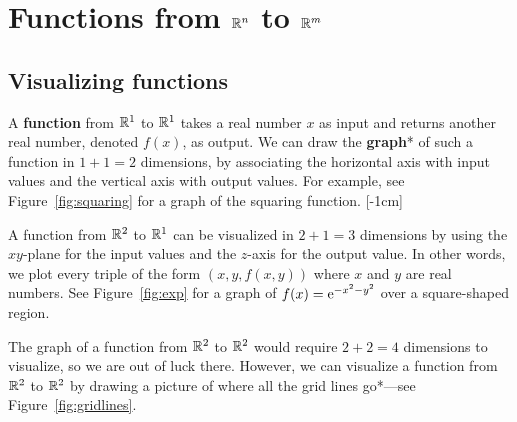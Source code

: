 \documentclass{watsonbook}
\begin{document}
\section{Functions from $\mathbb{R}^n$ to $\mathbb{R}^m$} \label{sec:RntoRn}

\subsection{Visualizing functions}

A \textbf{function} from $\mathbb{R}^1$ to $\mathbb{R}^1$ takes a real number $x$ as
input and returns another real number, denoted $f(x)$, as output. We
can draw the \textbf{graph}* of such a function in $1 + 1 = 2$
dimensions, by associating the horizontal axis with input values and
the vertical axis with output values. For example, see
Figure~\ref{fig:squaring} for a graph of the squaring
function. [-1cm]

A function from $\mathbb{R}^2$ to $\mathbb{R}^1$ can be visualized in $2 + 1 = 3$
dimensions by using the $xy$-plane for the input values and the
$z$-axis for the output value. In other words, we plot every triple of
the form $(x,y,f(x,y))$ where $x$ and $y$ are real numbers. See
Figure~\ref{fig:exp} for a graph of $f(x) = \mathrm{e}^{-x^2 - y^2}$ over a
square-shaped region.

The graph of a function from $\mathbb{R}^2$ to $\mathbb{R}^2$ would require
$2 + 2 = 4$ dimensions to visualize, so we are out of luck
there. However, we can visualize a function from $\mathbb{R}^2$ to $\mathbb{R}^2$ by
drawing a picture of where all the grid lines go*---see
Figure~\ref{fig:gridlines}.
\end{document}
